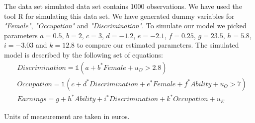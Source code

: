 \documentclass[a4paper,12pt,oneside,English]{article}
\begin{document}
The data set simulated data set contains 1000 observations. We have used the tool R for simulating this data set. We have generated dummy variables for \textit{"Female"}, \textit{"Occupation"} and \textit{"Discrimination"}. To simulate our model we picked parameters $a=0.5$, $b=2$, $c=3$, $d=-1.2$, $e=-2.1$, $f=0.25$, $g=23.5$, $h=5.8$, $i=-3.03$ and $k=12.8$ to compare our estimated parameters. The simulated model is described by the following set of equations:
\begin{equation}
    \begin{split}
        &Discrimination=\mathds{1}(a+b^*Female+u_D>2.8)\\
        &Occupation=\mathds{1}(c+d^*Discrimination+e^*Female+f^*Ability+u_O>7)\\
        &Earnings=g+h^*Ability+i^*Discrimination+k^*Occupation+u_E
    \end{split}
\end{equation}

Units of measurement are taken in euros.
\end{document}

